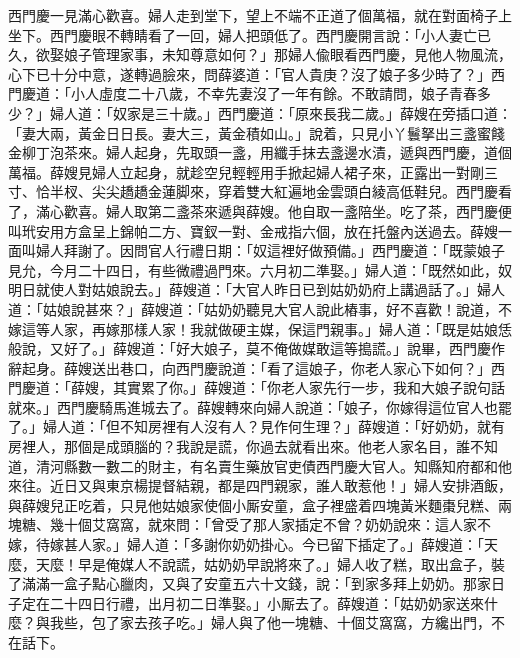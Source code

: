 西門慶一見滿心歡喜。婦人走到堂下，望上不端不正道了個萬福，就在對面椅子上坐下。西門慶眼不轉睛看了一回，婦人把頭低了。西門慶開言說：「小人妻亡已久，欲娶娘子管理家事，未知尊意如何？」那婦人偸眼看西門慶，見他人物風流，心下已十分中意，遂轉過臉來，問薛婆道：「官人貴庚？沒了娘子多少時了？」西門慶道：「小人虛度二十八歲，不幸先妻沒了一年有餘。不敢請問，娘子青春多少？」婦人道：「奴家是三十歲。」西門慶道：「原來長我二歲。」薛嫂在旁插口道：「妻大兩，黃金日日長。妻大三，黃金積如山。」{}說着，只見小丫鬟拏出三盞蜜餞金柳丁泡茶來。婦人起身，先取頭一盞，用纖手抹去盞邊水漬，{}遞與西門慶，道個萬福。薛嫂見婦人立起身，就趁空兒{}輕輕用手掀起婦人裙子來，正露出一對剛三寸、恰半杈、尖尖趫趫金蓮脚來，{}穿着雙大紅遍地金雲頭白綾高低鞋兒。{}西門慶看了，滿心歡喜。婦人取第二盞茶來遞與薛嫂。他自取一盞陪坐。吃了茶，西門慶便叫玳安用方盒呈上錦帕二方、寶釵一對、金戒指六個，放在托盤內送過去。薛嫂一面叫婦人拜謝了。因問官人行禮日期：「奴這裡好做預備。」西門慶道：「既蒙娘子見允，今月二十四日，有些微禮過門來。六月初二準娶。」婦人道：「既然如此，奴明日就使人對姑娘說去。」薛嫂道：「大官人昨日已到姑奶奶府上講過話了。」婦人道：「姑娘說甚來？」薛嫂道：「姑奶奶聽見大官人說此樁事，好不喜歡！說道，不嫁這等人家，再嫁那樣人家！我就做硬主媒，保這門親事。」婦人道：「既是姑娘恁般說，又好了。」{}薛嫂道：「好大娘子，莫不俺做媒敢這等搗謊。」說畢，西門慶作辭起身。薛嫂送出巷口，向西門慶說道：「看了這娘子，你老人家心下如何？」西門慶道：「薛嫂，其實累了你。」{}薛嫂道：「你老人家先行一步，我和大娘子說句話就來。」西門慶騎馬進城去了。薛嫂轉來向婦人說道：「娘子，你嫁得這位官人也罷了。」婦人道：「但不知房裡有人沒有人？{}見作何生理？」薛嫂道：「好奶奶，就有房裡人，那個是成頭腦的？我說是謊，你過去就看出來。{}他老人家名目，誰不知道，清河縣數一數二的財主，有名賣生藥放官吏債西門慶大官人。知縣知府都和他來往。近日又與東京楊提督結親，都是四門親家，誰人敢惹他！」婦人安排酒飯，與薛嫂兒正吃着，只見他姑娘家使個小厮安童，盒子裡盛着四塊黃米麵棗兒糕、兩塊糖、幾十個艾窩窩，就來問：「曾受了那人家插定不曾？奶奶說來：這人家不嫁，待嫁甚人家。」婦人道：「多謝你奶奶掛心。今已留下插定了。」薛嫂道：「天麼，天麼！早是俺媒人不說謊，姑奶奶早說將來了。」{}婦人收了糕，取出盒子，裝了滿滿一盒子點心臘肉，又與了安童五六十文錢，說：「到家多拜上奶奶。那家日子定在二十四日行禮，出月初二日準娶。」小厮去了。薛嫂道：「姑奶奶家送來什麼？與我些，包了家去孩子吃。」婦人與了他一塊糖、十個艾窩窩，方纔出門，不在話下。

